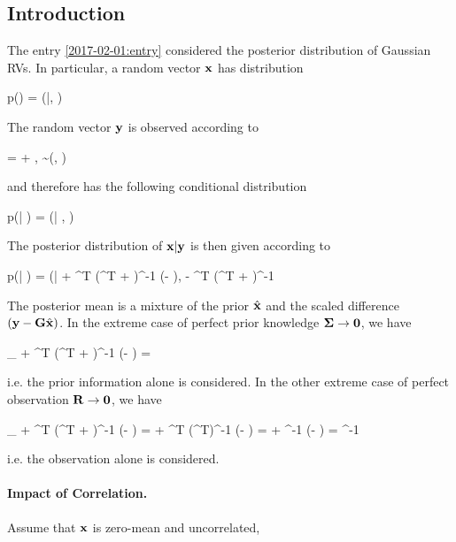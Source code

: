 
\subsection{Introduction}

The entry \ref{2017-02-01:entry} considered the posterior distribution of Gaussian RVs. In particular, a random vector $\mathbf{x}$ has distribution

\bee
p(\xbf) = \Nc(\xbf|\hat\xbf, \Sigmabf)
\eee

The random vector $\mathbf{y}$ is observed according to

\bee
\ybf = \Gbf \xbf + \vbf, \quad \vbf \sim \Nc(\zerobf, \Rbf)
\eee

and therefore has the following conditional distribution

\bee
p(\ybf | \xbf) = \Nc(\ybf | \Gbf \xbf, \Rbf)
\eee

The posterior distribution of $\mathbf{x} | \mathbf{y}$ is then given according to

\bee
p(\xbf | \ybf) = \Nc(\xbf | \hat\xbf + \Sigmabf \Gbf^T (\Gbf \Sigmabf \Gbf^T + \Rbf )^{-1} (\ybf - \Gbf \hat\xbf), \Sigmabf - \Sigmabf \Gbf^T (\Gbf \Sigmabf \Gbf^T + \Rbf)^{-1} \Gbf \Sigmabf
\eee

The posterior mean is a mixture of the prior $\hat{\mathbf{x}}$ and the scaled difference $(\mathbf{y} - \mathbf{G} \hat{\mathbf{x}})$. In the extreme case of perfect prior knowledge $\mathbf{\Sigma} \rightarrow \mathbf{0}$, we have

\bee
\lim_{\Sigmabf \rightarrow \zerobf} \hat\xbf + \Sigmabf \Gbf^T (\Gbf \Sigmabf \Gbf^T + \Rbf )^{-1} (\ybf - \Gbf \hat\xbf) = \hat\xbf
\eee

i.e. the prior information alone is considered. In the other extreme case of perfect observation $\mathbf{R} \rightarrow \mathbf{0}$, we have

\bee
\lim_{\Rbf \rightarrow \zerobf} \hat\xbf + \Sigmabf \Gbf^T (\Gbf \Sigmabf \Gbf^T + \Rbf )^{-1} (\ybf - \Gbf \hat\xbf) = \hat\xbf + \Sigmabf \Gbf^T (\Gbf \Sigmabf \Gbf^T)^{-1} (\ybf - \Gbf \hat\xbf) = \hat\xbf + \Gbf^{-1} (\ybf - \Gbf \hat\xbf) = \Gbf^{-1} \ybf
\eee

i.e. the observation alone is considered.

\paragraph{Impact of Correlation.} Assume that $\mathbf{x}$ is zero-mean and uncorrelated,

